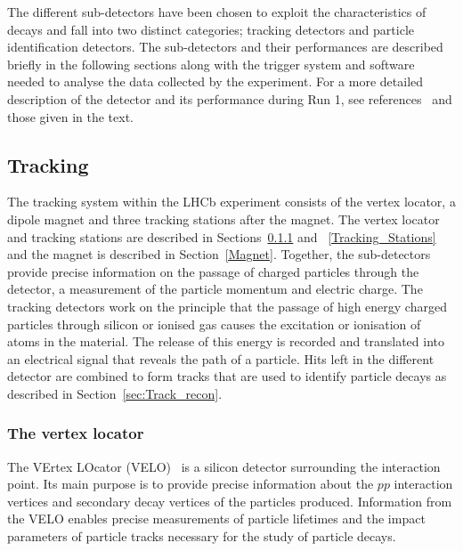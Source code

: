 The different sub-detectors have been chosen to exploit the characteristics of \bhadron decays and fall into two distinct categories; tracking detectors and particle identification detectors. The sub-detectors and their performances are described briefly in the following sections along with the trigger system and software needed to analyse the data collected by the experiment. %
For a more detailed description of the detector and its performance during Run 1, see references~\cite{TDR1,Alves:2008zz,LHCb:2003ab,Aaij:2014jba} and those given in the text.




\subsection{Tracking}
\label{Tracking}

The tracking system within the LHCb experiment consists of the vertex locator, a dipole magnet and three tracking stations after the magnet. The vertex locator and tracking stations are described in Sections~\ref{VELO} and ~\ref{Tracking_Stations} and the magnet is described in Section~\ref{Magnet}. Together, the sub-detectors provide precise information on the passage of charged particles through the detector, a measurement of the particle momentum and electric charge. 
The tracking detectors work on the principle that the passage of high energy charged particles through silicon or ionised gas causes the excitation or ionisation of atoms in the material. The release of this energy is recorded and translated into an electrical signal that reveals the path of a particle. 
Hits left in the different detector are combined to form tracks that are used to identify particle decays as described in Section~\ref{sec:Track_recon}.
\subsubsection{The vertex locator}
\label{VELO}
The VErtex LOcator (VELO)~\cite{Barbosa-Marinho:504321, LHCbVELOGroup:2014uea} is a silicon detector surrounding the interaction point. Its main purpose is to provide precise information about the $pp$ interaction vertices and secondary decay vertices of the particles produced. Information from the VELO enables precise measurements of particle lifetimes and the impact parameters of particle tracks necessary for the study of particle decays. %


